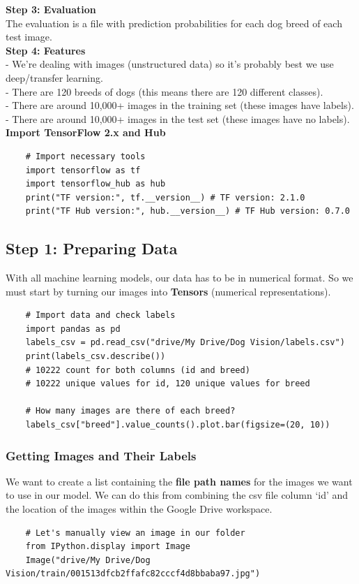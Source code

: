 \documentclass[11pt, a4paper]{article}
\begin{document}
\begin{spacing}{1.1}
	\textbf{Step 3: Evaluation} \\
	The evaluation is a file with prediction probabilities for each dog breed of each test image. \vspace*{1.5mm} \\
	\textbf{Step 4: Features} \\
	\hspace*{2mm} - We're dealing with images (unstructured data) so it's probably best we use deep/transfer learning. \\
	\hspace*{2mm} - There are 120 breeds of dogs (this means there are 120 different classes). \\
	\hspace*{2mm} - There are around 10,000+ images in the training set (these images have labels). \\
	\hspace*{2mm} - There are around 10,000+ images in the test set (these images have no labels). \vspace*{1.5mm} \\
	\textbf{Import TensorFlow 2.x and Hub}
	\begin{lstlisting}
	# Import necessary tools
	import tensorflow as tf
	import tensorflow_hub as hub 
	print("TF version:", tf.__version__) # TF version: 2.1.0
	print("TF Hub version:", hub.__version__) # TF Hub version: 0.7.0 \end{lstlisting} \newpage

	\subsection{Step 1: Preparing Data}
	With all machine learning models, our data has to be in numerical format. So we must start by turning our images into \textbf{Tensors} (numerical representations).
	\begin{lstlisting}
	# Import data and check labels
	import pandas as pd
	labels_csv = pd.read_csv("drive/My Drive/Dog Vision/labels.csv")
	print(labels_csv.describe())
	# 10222 count for both columns (id and breed)
	# 10222 unique values for id, 120 unique values for breed 
	
	# How many images are there of each breed?
	labels_csv["breed"].value_counts().plot.bar(figsize=(20, 10)) \end{lstlisting} \vspace*{1mm}
	\subsubsection{Getting Images and Their Labels}
	We want to create a list containing the \textbf{file path names} for the images we want to use in our model. We can do this from combining the csv file column `id' and the location of the images within the Google Drive workspace.
	\begin{lstlisting}
	# Let's manually view an image in our folder
	from IPython.display import Image
	Image("drive/My Drive/Dog Vision/train/001513dfcb2ffafc82cccf4d8bbaba97.jpg")
	

\end{lstlisting}
\end{spacing}
\end{document}

